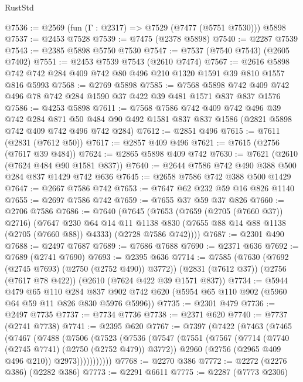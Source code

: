 \begin{lexlean}{RustStd}
\begin{coremodule}
@7536 := @2569 (fun (Γ : @2317) => @7529 (@7477 (@5751 @7530))) @5898
@7537 := @2453 @7528
@7539 := @7475 (@2378 @5898)
@7540 := @2287 @7539
@7543 := @2385 @5898 @5750 @7530
@7547 := @7537 (@7540 @7543) (@2605 @7402)
@7551 := @2453 @7539 @7543 (@2610 @7474)
@7567 := @2616 @5898 @742 @742 @284 @409 @742 @80 @496 @210 @1320 @1591 @39 @810 @1557 @816 @5993
@7568 := @2769 @5898
@7585 := @7568 @5898 @742 @409 @742 @496 @78 @742 @284 @1590 @37 @422 @39 @481 @1571 @837 @837 @1576
@7586 := @4253 @5898
@7611 := @7568
    @7586
    @742
    @409
    @742
    @496
    @39
    @742
    @284
    @871
    @50
    @484
    @90
    @492
    @1581
    @837
    @837
    @1586
    (@2821 @5898 @742 @409 @742 @496 @742 @284)
@7612 := @2851 @496
@7615 := @7611 (@2831 (@7612 @50))
@7617 := @2857 @409 @496
@7621 := @7615 (@2756 (@7617 @39 @484))
@7624 := @2865 @5898 @409 @742
@7630 := @7621 (@2610 (@7624 @484 @90 @1581 @837))
@7640 := @2644 @7586 @742 @490 @388 @500 @284 @837 @1429 @742 @636
@7645 := @2658 @7586 @742 @388 @500 @1429
@7647 := @2667 @7586 @742
@7653 := @7647 @62 @232 @59 @16 @826 @1140
@7655 := @2697 @7586 @742
@7659 := @7655 @37 @59 @37 @826
@7660 := @2706 @7586
@7686 := @7640
    (@7645
      (@7653
        (@7659 (@2705 (@7660 @37)) @2716)
        (@7647
          @230
          @64
          @14
          @11
          @1138
          @830
          (@7655 @88 @14 @88 @1138 (@2705 (@7660 @88)) @4333)
          (@2728 @7586 @742))))
@7687 := @2301 @490
@7688 := @2497 @7687
@7689 := @7686 @7688
@7690 := @2371 @636
@7692 := @7689 (@2741 @7690)
@7693 := @2395 @636
@7714 := @7585
    (@7630 (@7692 (@2745 @7693) (@2750 (@2752 @490)) @3772))
    (@2831 (@7612 @37))
    (@2756 (@7617 @78 @422))
    (@2610 (@7624 @422 @39 @1571 @837))
@7734 := @5944
    @479
    @65
    @110
    @284
    @837
    @902
    @742
    @620
    (@5954 @65 @110 @902 (@5960 @64 @59 @11 @826 @830 @5976 @5996))
@7735 := @2301 @479
@7736 := @2497 @7735
@7737 := @7734 @7736
@7738 := @2371 @620
@7740 := @7737 (@2741 @7738)
@7741 := @2395 @620
@7767 := @7397
    (@7422
      (@7463
        (@7465
          (@7467
            (@7488
              (@7506
                (@7523
                  (@7536
                    (@7547
                      (@7551
                        (@7567
                          (@7714 (@7740 (@2745 @7741) (@2750 (@2752 @479)) @3772))
                          @2960
                          (@2756 (@2965 @409 @496 @210))
                          @2973)))))))))))
@7768 := @2270 @386
@7772 := @2272 (@2276 @386) (@2282 @386)
@7773 := @2291 @6611
@7775 := @2287 (@7773 @2306)

\end{coremodule}
\end{lexlean}
